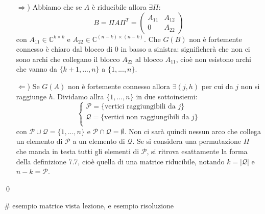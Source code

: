 \documentclass[a4paper,11pt]{article}
\begin{document}
\begin{itemize}
	\item[$\Rightarrow$)] 
Abbiamo che se $A$ è riducibile allora $\exists \Pi$:
$$
B = \Pi A \Pi^T = \begin{pmatrix}
	A_{11} & A_{12} \\
	0 & A_{22}
\end{pmatrix}
$$
con $A_{11} \in \mathbb{C}^{k\times k}$ e $A_{22} \in \mathbb{C}^{(n - k) \times (n - k)}$.
Che $G(B)$ non è fortemente connesso è chiaro dal blocco di 0 in basso a sinistra: significherà che non ci sono archi che collegano il blocco $A_{22}$ al blocco $A_{11}$, cioè non esistono archi che vanno da $\{k + 1, ..., n\}$ a $\{1, ..., n\}$.

\item[$\Leftarrow$)]
	Se $G(A)$ non è fortemente connesso allora $\exists (j, h)$ per cui da $j$ non si raggiunge $h$.
	Dividamo allra $\{1, ..., n\}$ in due sottoinsiemi:
	\[
		\begin{cases}
			\mathcal{P} = \{ \text{vertici raggiungibili da $j$} \}	\\
			\mathcal{Q} = \{ \text{vertici non raggiungibili da $j$} \}	\\
		\end{cases}
	\]
	con $\mathcal{P} \cup \mathcal{Q} = \{1, ..., n\}$ e $\mathcal{P} \cap \mathcal{Q} = \emptyset$.
	Non ci sarà quindi nessun arco che collega un elemento di $\mathcal{P}$ a un elemento di $\mathcal{Q}$.
	Se si considera una permutazione $\Pi$ che manda in testa tutti gli elementi di $\mathcal{P}$, si ritrova esattamente la forma della definizione 7.7, cioè quella di una matrice riducibile, notando $k = |\mathcal{Q}|$ e $n - k = \mathcal{P}$.
\end{itemize} \qed

# esempio matrice vista lezione, e esempio risoluzione
\end{document}
